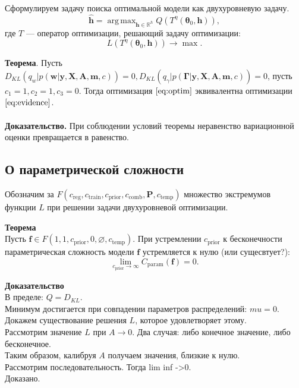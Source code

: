 \documentclass[12pt]{article}
\DeclareMathOperator*{\argmax}{arg\,max}
\begin{document}
Сформулируем задачу поиска оптимальной модели как двухуровневую задачу.
\begin{equation}
\label{eq:optim}
	\hat{\mathbf{h}} = \argmax_{\mathbf{h} \in \mathbb{R}^h} Q( T^\eta(\boldsymbol{\theta}_0, \mathbf{h})),
\end{equation}
где $T$ --- оператор оптимизации, решающий задачу оптимизации:
\[
    L(T^\eta(\boldsymbol{\theta}_0, \mathbf{h})) \to \max.
\]


\textbf{Теорема}. Пусть $D_{KL}(q_w|p(\mathbf{w}|\mathbf{y}, \mathbf{X}, \mathbf{A},\mathbf{m}, c)) = 0, D_{KL}(q_\gamma|p(\boldsymbol{\Gamma}|\mathbf{y}, \mathbf{X}, \mathbf{A},\mathbf{m}, c)) = 0$, пусть $c_1 = 1, c_2 = 1, c_3 = 0$. Тогда оптимизация $\eqref{eq:optim}$ эквивалентна оптимизации $\eqref{eq:evidence}$.\\~\\
\textbf{Доказательство.} При соблюдении условий теоремы неравенство вариационной оценки превращается в равенство. 


\subsection{О параметрической сложности}
Обозначим за $F(c_{\text{reg}}, c_{\text{train}}, c_{\text{prior}}, c_{\text{comb}}, \mathbf{P}, c_{\text{temp}})$ множество экстремумов функции $L$ при решении задачи двухуровневой оптимизации.

\textbf{Теорема}\\
Пусть $\mathbf{f} \in F(1, 1, c_{\text{prior}}, 0, \varnothing,  c_{\text{temp}} )$.
При устремлении $ c_{\text{prior}}$ к бесконечности параметрическая сложность модели $\mathbf{f}$ устремляется к нулю (или сущесвтует?):
\[
    \lim_{c_{\text{prior}} \to \infty} C_{\text{param}}(\mathbf{f}) = 0.
\]

\textbf{Доказательство}\\
В пределе: $Q = D_{KL}.$\\
Минимум достигается при совпадении параметров распределений: $mu = 0$.\\
Докажем существование решения $L$, которое удовлетворяет этому.\\
Рассмотрим значение $L$ при $A \to 0$. Два случая: либо конечное значение, либо бесконечное.\\
Таким образом, калибруя $A$ получаем значения, близкие к нулю. \\
Рассмотрим последовательность. Тогда lim inf ->0.\\
Доказано. 
\end{document}
